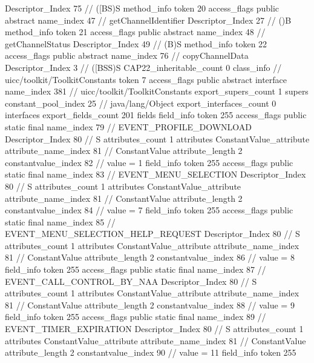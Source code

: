 {{{{{					Descriptor_Index	75		// ([BS)S
				}
				method_info {
					token	20
					access_flags	public abstract
					name_index	47		// getChannelIdentifier
					Descriptor_Index	27		// ()B
				}
				method_info {
					token	21
					access_flags	public abstract
					name_index	48		// getChannelStatus
					Descriptor_Index	49		// (B)S
				}
				method_info {
					token	22
					access_flags	public abstract
					name_index	76		// copyChannelData
					Descriptor_Index	3		// ([BSS)S
				}
			}
			CAP22_inheritable_count	0
		}
		class_info {		// uicc/toolkit/ToolkitConstants
			token	7
			access_flags	public abstract interface
			name_index	381		// uicc/toolkit/ToolkitConstants
			export_supers_count	1
			supers {
				constant_pool_index	25		// java/lang/Object
			}
			export_interfaces_count	0
			interfaces {
			}
			export_fields_count	201
			fields {
			field_info {
				token	255
				access_flags	public static final
				name_index	79		// EVENT_PROFILE_DOWNLOAD
				Descriptor_Index	80		// S
				attributes_count	1
				attributes {
				ConstantValue_attribute {
					attribute_name_index	81		// ConstantValue
					attribute_length	2
					constantvalue_index	82		// value = 1
				}
				}
			}
			field_info {
				token	255
				access_flags	public static final
				name_index	83		// EVENT_MENU_SELECTION
				Descriptor_Index	80		// S
				attributes_count	1
				attributes {
				ConstantValue_attribute {
					attribute_name_index	81		// ConstantValue
					attribute_length	2
					constantvalue_index	84		// value = 7
				}
				}
			}
			field_info {
				token	255
				access_flags	public static final
				name_index	85		// EVENT_MENU_SELECTION_HELP_REQUEST
				Descriptor_Index	80		// S
				attributes_count	1
				attributes {
				ConstantValue_attribute {
					attribute_name_index	81		// ConstantValue
					attribute_length	2
					constantvalue_index	86		// value = 8
				}
				}
			}
			field_info {
				token	255
				access_flags	public static final
				name_index	87		// EVENT_CALL_CONTROL_BY_NAA
				Descriptor_Index	80		// S
				attributes_count	1
				attributes {
				ConstantValue_attribute {
					attribute_name_index	81		// ConstantValue
					attribute_length	2
					constantvalue_index	88		// value = 9
				}
				}
			}
			field_info {
				token	255
				access_flags	public static final
				name_index	89		// EVENT_TIMER_EXPIRATION
				Descriptor_Index	80		// S
				attributes_count	1
				attributes {
				ConstantValue_attribute {
					attribute_name_index	81		// ConstantValue
					attribute_length	2
					constantvalue_index	90		// value = 11
				}
				}
			}
			field_info {
				token	255
}}}}}
